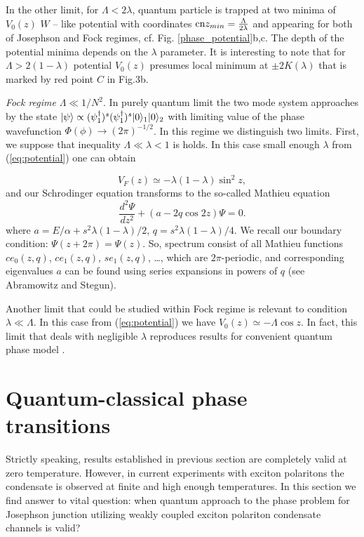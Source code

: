 \documentclass[aps, pre, preprint, groupedaddress, superscriptaddress, showkeys, showpacs] {revtex4-1}
\DeclarePairedDelimiter\ket{\lvert}{\rangle}
\begin{document}
In the other limit, for $\Lambda < 2 \lambda$, quantum particle is trapped at two minima of $V_0(z)$ $W$ -- like potential with coordinates $\textrm{cn}{z_{min}} = \frac{\Lambda}{2 \lambda}$ and appearing for both of Josephson and Fock regimes, cf. Fig. \ref{phase_potential}b,c.  
The depth of the potential minima depends on the $\lambda$ parameter.
It is interesting to note that for $\Lambda > 2(1 - \lambda)$ potential $V_0(z)$ presumes local minimum at $\pm 2 K(\lambda)$ that is marked by red point $C$ in Fig.3b.

\textit{Fock regime} $\Lambda \ll 1/N^2$.
In purely quantum limit the two mode system approaches by the state $\ket{\psi} \propto (\psi_1^\dag)^s (\psi_1^\dag)^s \ket{0}_1 \ket{0}_2$ with limiting value of the phase wavefunction $\Phi(\phi) \to (2\pi)^{-1/2}$.
In this regime we distinguish two limits.
First, we suppose that inequality $\Lambda \ll \lambda < 1$ is holds.
In this case small enough $\lambda$ from (\ref{eq:potential}) one can obtain
%
{\red

%
\begin{equation}
V_F(z) \simeq -\lambda (1 - \lambda) \sin^2{z},
\end{equation}
%
and our Schrodinger equation transforms to the so-called Mathieu equation
%
\begin{equation}
\frac{d^2 \Psi}{d z^2} + (a - 2q  \cos{2z}) \Psi = 0.
\end{equation}
%
where $a = E / \alpha + s^2 \lambda(1 - \lambda) / 2$, $q = s^2 \lambda (1 - \lambda)/ 4$.
We recall our boundary condition: $\Psi(z + 2\pi) = \Psi(z)$.
So, spectrum consist of all Mathieu functions $ce_0(z, q)$, $ce_1(z, q)$, $se_1(z, q)$, \dots, which are $2\pi$-periodic, and corresponding eigenvalues $a$ can be found using series expansions in powers of $q$ (see Abramowitz and Stegun). 
}

Another limit that could be studied within Fock regime is relevant to condition $\lambda \ll \Lambda$. In this case from (\ref{eq:potential}) we have $V_0(z) \simeq -\Lambda \cos{z}$.
In fact, this limit that deals with negligible $\lambda$ reproduces results for convenient quantum phase model \cite{Anglin}.


\section{Quantum-classical phase transitions \label{sec:quantum_classical}}

Strictly speaking, results established in previous section are completely valid at zero temperature. However, in current experiments with exciton polaritons  the condensate is observed at finite and high enough temperatures.
In this section we find answer to vital question: when quantum approach to the phase problem for Josephson junction utilizing weakly coupled exciton polariton condensate channels is valid?
\end{document}
